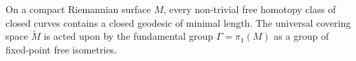 On a compact Riemannian surface $M$, every non-trivial free homotopy class of closed curves contains a closed geodesic of minimal length. The universal covering space $\tilde{M}$ is acted upon by the fundamental group $\Gamma = \pi_1(M)$ as a group of fixed-point free isometries.